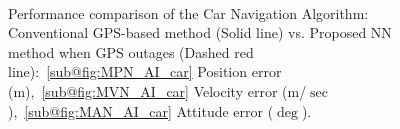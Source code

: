 \documentclass[3p]{elsarticle}
\begin{document}
\begin{figure}[H]
{	}\\
	\caption{%
Performance comparison of the Car Navigation Algorithm: Conventional GPS-based method (Solid line) vs. Proposed NN method when GPS outages (Dashed red line):~\ref{sub@fig:MPN_AI_car} Position error (m),~\ref{sub@fig:MVN_AI_car} Velocity error (m/\(\sec\)),~\ref{sub@fig:MAN_AI_car} Attitude error (\(\deg\)).
}
\label{fig:AI_car}
\end{figure}
\end{document}
